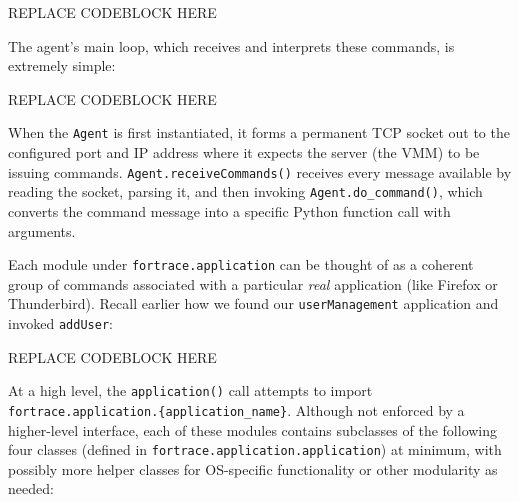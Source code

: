 REPLACE CODEBLOCK HERE

The agent's main loop, which receives and interprets these commands, is
extremely simple:

REPLACE CODEBLOCK HERE

When the \texttt{Agent} is first instantiated, it forms a permanent TCP
socket out to the configured port and IP address where it expects the
server (the VMM) to be issuing commands.
\texttt{Agent.receiveCommands()} receives every message available by
reading the socket, parsing it, and then invoking
\texttt{Agent.do\_command()}, which converts the command message into a
specific Python function call with arguments.

Each module under \texttt{fortrace.application} can be thought of as a
coherent group of commands associated with a particular \emph{real}
application (like Firefox or Thunderbird). Recall earlier how we found
our \texttt{userManagement} application and invoked \texttt{addUser}:

REPLACE CODEBLOCK HERE

At a high level, the \texttt{application()} call attempts to import
\texttt{fortrace.application.\{application\_name\}}. Although not
enforced by a higher-level interface, each of these modules contains
subclasses of the following four classes (defined in
\texttt{fortrace.application.application}) at minimum, with possibly
more helper classes for OS-specific functionality or other modularity as
needed:

